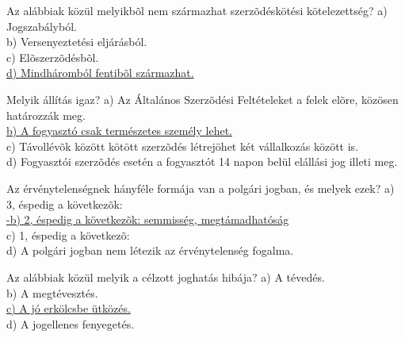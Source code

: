 \begin{frame}

\begin{tcolorbox}[title={152. Kérdés}]
Az alábbiak közül melyikbõl nem származhat szerzõdéskötési kötelezettség?
\tcblower
a) Jogszabályból.\\
b) Versenyeztetési eljárásból.\\
c) Elõszerzõdésbõl.\\
\uline {d) Mindháromból fentibõl származhat.}
\end{tcolorbox}

\begin{tcolorbox}[title={153. Kérdés}]
Melyik állítás igaz?
\tcblower
a) Az Általános Szerzõdési Feltételeket a felek elõre, közösen határozzák meg.\\
\uline {b) A fogyasztó csak természetes személy lehet.}\\
c) Távollévõk között kötött szerzõdés létrejöhet két vállalkozás között is.\\
d) Fogyasztói szerzõdés esetén a fogyasztót 14 napon belül elállási jog illeti meg.
\end{tcolorbox}

\begin{tcolorbox}[title={154. Kérdés}]
Az érvénytelenségnek hányféle formája van a polgári jogban, és melyek ezek?
\tcblower
a) 3, éspedig a következõk:\\
\uline {-b) 2, éspedig a következõk: semmisség, megtámadhatóság}\\
c) 1, éspedig a következõ:\\
d) A polgári jogban nem létezik az érvénytelenség fogalma.
\end{tcolorbox}

\begin{tcolorbox}[title={155. Kérdés}]
Az alábbiak közül melyik a célzott joghatás hibája?
\tcblower
a) A tévedés.\\
b) A megtévesztés.\\
\uline {c) A jó erkölcsbe ütközés.}\\
d) A jogellenes fenyegetés.
\end{tcolorbox}

\end{frame}


